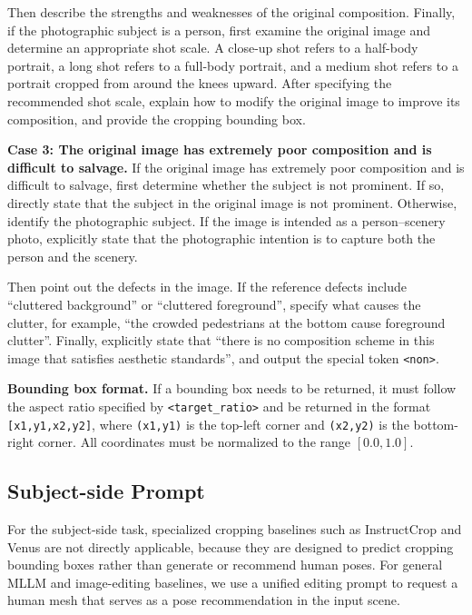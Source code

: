 \documentclass{article} %
\begin{document}
\begin{promptbox}
Then describe the strengths and weaknesses of the original composition. Finally, if the photographic subject is a person, first examine the original image and determine an appropriate shot scale. A close-up shot refers to a half-body portrait, a long shot refers to a full-body portrait, and a medium shot refers to a portrait cropped from around the knees upward. After specifying the recommended shot scale, explain how to modify the original image to improve its composition, and provide the cropping bounding box.

\vspace{0.5em}
\noindent\textbf{Case 3: The original image has extremely poor composition and is difficult to salvage.}
If the original image has extremely poor composition and is difficult to salvage, first determine whether the subject is not prominent. If so, directly state that the subject in the original image is not prominent. Otherwise, identify the photographic subject. If the image is intended as a person--scenery photo, explicitly state that the photographic intention is to capture both the person and the scenery.

Then point out the defects in the image. If the reference defects include ``cluttered background'' or ``cluttered foreground'', specify what causes the clutter, for example, ``the crowded pedestrians at the bottom cause foreground clutter''. Finally, explicitly state that ``there is no composition scheme in this image that satisfies aesthetic standards'', and output the special token \texttt{<non>}.

\vspace{0.5em}
\noindent\textbf{Bounding box format.}
If a bounding box needs to be returned, it must follow the aspect ratio specified by \texttt{<target\_ratio>} and be returned in the format \texttt{[x1,y1,x2,y2]}, where \texttt{(x1,y1)} is the top-left corner and \texttt{(x2,y2)} is the bottom-right corner. All coordinates must be normalized to the range \([0.0, 1.0]\).

\end{promptbox}


\subsection{Subject-side Prompt}
\label{app:subject_side_baseline_prompt}

For the subject-side task, specialized cropping baselines such as InstructCrop and Venus are not directly applicable, because they are designed to predict cropping bounding boxes rather than generate or recommend human poses. For general MLLM and image-editing baselines, we use a unified editing prompt to request a human mesh that serves as a pose recommendation in the input scene.
\end{document}
